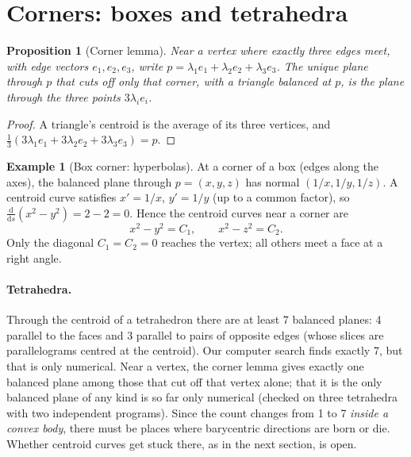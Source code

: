 \documentclass[11pt]{article}
\theoremstyle{plain}
\newtheorem{proposition}[lemma]{Proposition}
\theoremstyle{definition}
\newtheorem{example}[lemma]{Example}
\theoremstyle{remark}
\begin{document}
\section{Corners: boxes and tetrahedra}\label{sec:corners}

\begin{proposition}[Corner lemma]
Near a vertex where exactly three edges meet, with edge vectors $e_1,e_2,e_3$, write $p=\lambda_1e_1+\lambda_2e_2+\lambda_3e_3$. The unique plane through $p$ that cuts off only that corner, with a triangle balanced at $p$, is the plane through the three points $3\lambda_ie_i$.
\end{proposition}
\begin{proof}
A triangle's centroid is the average of its three vertices, and $\tfrac13(3\lambda_1e_1+3\lambda_2e_2+3\lambda_3e_3)=p$.
\end{proof}

\begin{example}[Box corner: hyperbolas]
At a corner of a box (edges along the axes), the balanced plane through $p=(x,y,z)$ has normal $(1/x,1/y,1/z)$. A centroid curve satisfies $x'=1/x$, $y'=1/y$ (up to a common factor), so $\frac{\mathrm d}{\mathrm ds}(x^2-y^2)=2-2=0$. Hence the centroid curves near a corner are
\[
  x^2-y^2=C_1,\qquad x^2-z^2=C_2 .
\]
Only the diagonal $C_1=C_2=0$ reaches the vertex; all others meet a face at a right angle.
\end{example}

\paragraph{Tetrahedra.} Through the centroid of a tetrahedron there are at least 7 balanced planes: 4 parallel to the faces and 3 parallel to pairs of opposite edges (whose slices are parallelograms centred at the centroid). Our computer search finds exactly 7, but that is only numerical. Near a vertex, the corner lemma gives exactly one balanced plane among those that cut off that vertex alone; that it is the only balanced plane of any kind is so far only numerical (checked on three tetrahedra with two independent programs). Since the count changes from 1 to 7 \emph{inside a convex body}, there must be places where barycentric directions are born or die. Whether centroid curves get stuck there, as in the next section, is open.

\end{document}
